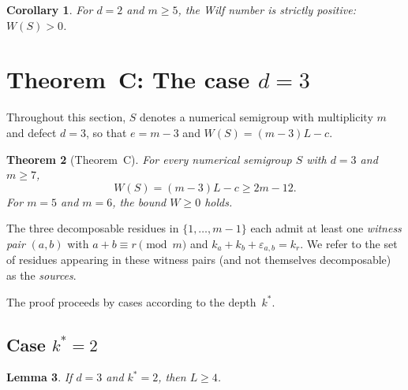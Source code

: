 \documentclass[11pt]{amsart}
\newtheorem{theorem}{Theorem}[section]
\newtheorem{lemma}[theorem]{Lemma}
\newtheorem{corollary}[theorem]{Corollary}
\theoremstyle{definition}
\theoremstyle{remark}
\begin{document}
\begin{corollary}\label{cor:positive-d2}
For $d = 2$ and $m \ge 5$, the Wilf number is strictly positive: $W(S) > 0$.
\end{corollary}

\section{Theorem~C: The case \texorpdfstring{$d = 3$}{d = 3}}\label{sec:thmC}

Throughout this section, $S$ denotes a numerical semigroup with multiplicity $m$
and defect $d = 3$, so that $e = m - 3$ and
$W(S) = (m - 3)L - c$.

\begin{theorem}[Theorem~C]\label{thm:C}
For every numerical semigroup $S$ with $d = 3$ and $m \ge 7$,
\[
  W(S) = (m - 3) L - c \ge 2m - 12.
\]
For $m = 5$ and $m = 6$, the bound $W \ge 0$ holds.
\end{theorem}

The three decomposable residues in $\{1, \ldots, m-1\}$ each admit at least
one \emph{witness pair} $(a, b)$ with $a + b \equiv r \pmod{m}$ and
$k_a + k_b + \varepsilon_{a,b} = k_r$.  We refer to the set of residues
appearing in these witness pairs (and not themselves decomposable) as
the \emph{sources}.

The proof proceeds by cases according to the depth~$k^*$.

\subsection{Case $k^* = 2$}

\begin{lemma}\label{lem:C-k2}
If $d = 3$ and $k^* = 2$, then $L \ge 4$.
\end{lemma}
\end{document}
